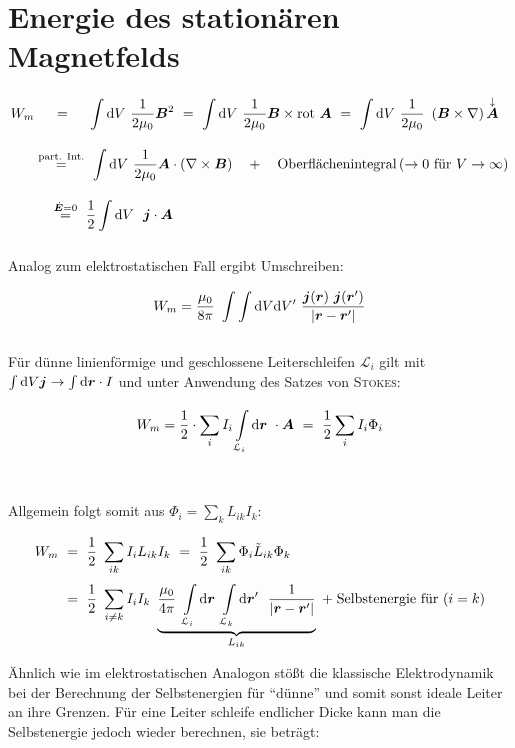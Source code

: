 \section{Energie des stationären Magnetfelds}

\begin{align*}
W_m & \ \quad = \quad  \ \Int{}{}{V}\frac{1}{2\mu_0}\vec{B}^2 \ =  \ \Int{}{}{V} \frac{1}{2\mu_0} \vec{B}\times\rot\vec{A} \ = \ \Int{}{}{V} \frac{1}{2\mu_0} \ \left(\vec{B}\times\nabla\right) \overset{\downarrow}{\vec{A}}\\
& \overset{\text{part. Int.}}{=}  \  \Int{}{}{V} \frac{1}{2\mu_0} \vec{A} \cdot\left(\nabla\times\vec{B}\right) \quad + \quad \text{Oberflächenintegral} \left(\rightarrow 0 \text{ für } V \rightarrow \infty\right)\\
& \;\;\;\;\overset{\dot{\vec{E}}=0}{=} \ \frac{1}{2} \Int{}{}{V} \ \vec{j}\cdot\vec{A}
\end{align*}

Analog zum elektrostatischen Fall ergibt Umschreiben:

\begin{equation*}
W_m = \frac{\mu_0}{8\pi} \ \int\int\d V \d V' \ \frac{\vec{j}(\vec{r}) \ \vec{j}(\vec{r}')}{|\vec{r}-\vec{r}'|}
\end{equation*}
\ \\

Für dünne linienförmige und geschlossene Leiterschleifen $\mathcal{L}_i$ gilt mit $\int\mathrm{d} V\bm{j} \rightarrow \int\mathrm{d} \bm{r} \cdot I$ und unter Anwendung des Satzes von \textsc{Stokes}:

\begin{equation*}
W_m = \frac{1}{2} \cdot \sum_i I_i \int\limits_{{\mathcal{L}_i}}^{{}}\mathrm{d}{\bm{r}}\  \cdot \bm{A} \ = \ \frac{1}{2} \sum_i I_i \Phi_i
\end{equation*}
\ \\
\ \\
Allgemein folgt somit aus $\Phi_i = \sum_k L_{ik} I_k$:

\begin{align*}
W_m \ &= \ \frac{1}{2} \ \sum_{ik}  I_i L_{ik} I_k \ = \ \frac{1}{2} \ \sum_{ik} \Phi_i \tilde{L}_{ik} \Phi_k\\
&= \ \frac{1}{2} \ \sum_{i\neq k} I_i I_k \ \underbrace{\frac{\mu_0}{4\pi} \ \Int{\mathcal{L}_i}{}{\vec{r}} \Int{\mathcal{L}_k}{}{\vec{r}'} \ \frac{1}{|\vec{r}-\vec{r}'|}}_{L_{ik}} \; + \; \text{Selbstenergie für } (i=k)
\end{align*}

Ähnlich wie im elektrostatischen Analogon stößt die klassische Elektrodynamik bei der Berechnung der Selbstenergien für ``dünne'' und somit sonst ideale Leiter an ihre Grenzen. Für eine Leiter schleife endlicher Dicke kann man die Selbstenergie jedoch wieder berechnen, sie beträgt:


